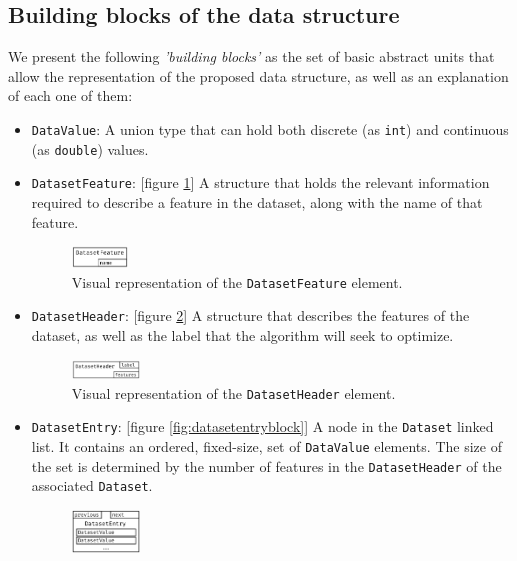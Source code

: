 \documentclass{acm_proc_article-sp}
\begin{document}
\subsection{Building blocks of the data structure}
We present the following \textit{'building blocks'} as the set of basic abstract units that allow the representation of the proposed data structure, as well as an explanation of each one of them:
\begin{itemize}
  \item \texttt{DataValue}: A union type that can hold both discrete (as \texttt{int}) and continuous (as \texttt{double}) values.
  \item \texttt{DatasetFeature}: [figure \ref{fig:datasetfeatureblock}] A structure that holds the relevant information required to describe a feature in the dataset, along with the name of that feature.
  \begin{figure}[h]
    \centering
    \includegraphics[width=0.14\textwidth]{datasetfeatureblock}
    \caption{Visual representation of the \texttt{DatasetFeature} element.}
    \label{fig:datasetfeatureblock}
  \end{figure}
  \item \texttt{DatasetHeader}: [figure \ref{fig:datasetheaderblock}] A structure that describes the features of the dataset, as well as the label that the algorithm will seek to optimize.
  \begin{figure}[h]
    \centering
    \includegraphics[width=0.17\textwidth]{datasetheaderblock}
    \caption{Visual representation of the \texttt{DatasetHeader} element.}
    \label{fig:datasetheaderblock}
  \end{figure}
  \item \texttt{DatasetEntry}: [figure \ref{fig:datasetentryblock}] A node in the \texttt{Dataset} linked list. It contains an ordered, fixed-size, set of \texttt{DataValue} elements. The size of the set is determined by the number of features in the \texttt{DatasetHeader} of the associated \texttt{Dataset}.
  \begin{figure}[h]
    \centering
    \includegraphics[width=0.17\textwidth]{datasetentryblock}

\end{figure}
\end{itemize}
\end{document}
